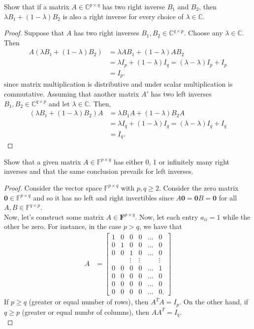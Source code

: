 \documentclass[12pt]{article}
\newenvironment{problem}[2][Problem]{\begin{trivlist} \item[\hskip \labelsep {\bfseries #1}\hskip \labelsep {\bfseries #2.}]}{\end{trivlist}}
\begin{document}
    \begin{problem}{1.15}
      Show that if a matrix $A\in \mathbb{C}^{p\times q}$ has two right inverse $B_{1}$ and $B_{2}$, then $\lambda B_{1} + (1-\lambda)B_{2}$ is also a right inverse for every choice of $\lambda \in \mathbb{C}$.
\begin{proof}
  Suppose that $A$ has two right inverses $B_{1},B_{2}\in \mathbb{C}^{q\times p}$. Choose any $\lambda \in \mathbb{C}$. Then
\begin{align*}
  A\left( \lambda B_{1} + (1-\lambda)B_{2} \right) &= \lambda AB_{1} + (1-\lambda)AB_{2}\\
  &= \lambda I_{p} + (1-\lambda)I_{q} = (\lambda - \lambda)I_{p} + I_{p}\\
  &= I_{p}.
\end{align*}
since matrix multiplication is distributive and  under scalar multiplication is commutative. Assuming that another matrix $A'$ has two left inverses $B_{1},B_{2}\in \mathbb{C}^{q\times p}$ and let $\lambda \in \mathbb{C}$. Then,
\begin{align*}
  \left( \lambda B_{1} + (1-\lambda)B_{2} \right)A &= \lambda B_{1}A + (1-\lambda)B_{2}A\\
  &= \lambda I_{q} + (1-\lambda)I_{q} = (\lambda - \lambda)I_{q} + I_{q}\\
  &= I_{q}.
\end{align*}
\end{proof}
\begin{problem}{1.16}
  Show that a given matrix $A\in \mathbb{F}^{p\times q}$ has either 0, 1 or infinitely many right inverses and that the same conclusion prevails for left inverses.
\end{problem}
\begin{proof}
  Consider the vector space $\mathbb{F}^{p\times q}$ with $p,q\geq 2$. Consider the zero matrix $\mathbf{0}\in \mathbb{F}^{p\times q}$ and so it has no left and right invertibles since $A\mathbf{0} = \mathbf{0}B = \mathbf{0}$ for all $A,B\in \mathbb{F}^{q\times p}$. \\
  Now, let's construct some matrix $A\in \mathbf{F}^{p\times q}$. Now, let each entry $a_{ii}=1$ while the other be zero. For instance, in the case $p>q$, we have that 
\begin{align*}
  A &= 
\begin{bmatrix}
  1 & 0 & 0 & 0 & \dots & 0 \\
  0 & 1 & 0 & 0 &  \dots & 0\\
  0 & 0 & 1 & 0 &  \dots & 0\\
   &   &  \vdots & \vdots & & \vdots\\
   0 & 0 & 0 & 0 &  \dots & 1\\
   0 & 0 & 0 & 0 &  \dots & 0\\
   0 & 0 & 0 & 0 &  \dots & 0\\
   0 & 0 & 0 & 0 & \dots & 0.
\end{bmatrix}
\end{align*}
If $p\geq q$ (greater or equal number of rows), then $A^{T}A = I_{p}$. On the other hand, if $q\geq p$ (greater or equal numbr of columns), then $AA^{T} = I_{q}$.\\


\end{proof}
\end{problem}
\end{document}
